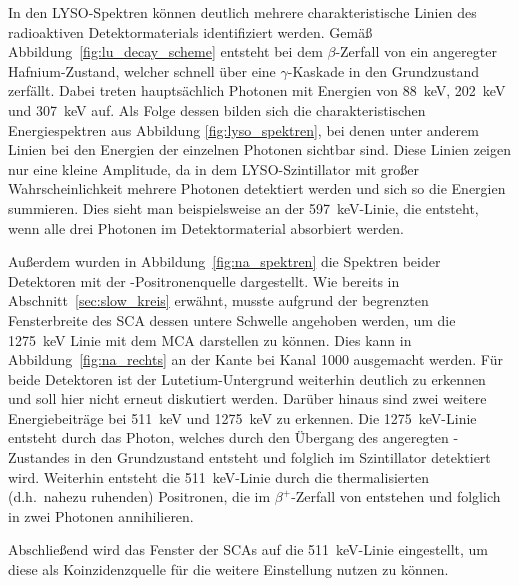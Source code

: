 \documentclass[11pt, a4paper]{article}
\numberwithin{equation}{section}
\begin{document}
In den LYSO-Spektren können deutlich mehrere charakteristische Linien des radioaktiven Detektormaterials identifiziert werden.
Gemäß Abbildung~\ref{fig:lu_decay_scheme} entsteht bei dem $\beta$-Zerfall von  ein angeregter Hafnium-Zustand, welcher schnell über eine $\gamma$-Kaskade in den Grundzustand zerfällt.
Dabei treten hauptsächlich Photonen mit Energien von \SI{88}{\keV}, \SI{202}{\keV} und \SI{307}{\keV} auf.
Als Folge dessen bilden sich die charakteristischen Energiespektren aus Abbildung \ref{fig:lyso_spektren}, bei denen unter anderem Linien bei den Energien der einzelnen Photonen sichtbar sind.
Diese Linien zeigen nur eine kleine Amplitude, da in dem LYSO-Szintillator mit großer Wahrscheinlichkeit mehrere Photonen detektiert werden und sich so die Energien summieren.
Dies sieht man beispielsweise an der \SI{597}{\keV}-Linie, die entsteht, wenn alle drei Photonen im Detektormaterial absorbiert werden.

Außerdem wurden in Abbildung~\ref{fig:na_spektren} die Spektren beider Detektoren mit der -Positronenquelle dargestellt.
Wie bereits in Abschnitt~\ref{sec:slow_kreis} erwähnt, musste aufgrund der begrenzten Fensterbreite des SCA dessen untere Schwelle angehoben werden, um die \SI{1275}{\keV} Linie mit dem MCA darstellen zu können.
Dies kann in Abbildung~\ref{fig:na_rechts} an der Kante bei Kanal 1000 ausgemacht werden.
Für beide Detektoren ist der Lutetium-Untergrund weiterhin deutlich zu erkennen und soll hier nicht erneut diskutiert werden.
Darüber hinaus sind zwei weitere Energiebeiträge bei \SI{511}{\keV} und \SI{1275}{\keV} zu erkennen.
Die \SI{1275}{\keV}-Linie entsteht durch das Photon, welches durch den Übergang des angeregten -Zustandes in den Grundzustand entsteht und folglich im Szintillator detektiert wird.
Weiterhin entsteht die \SI{511}{\keV}-Linie durch die thermalisierten (d.h.\ nahezu ruhenden) Positronen, die im $\beta^+$-Zerfall von  entstehen und folglich in zwei Photonen annihilieren.

Abschließend wird das Fenster der SCAs auf die \SI{511}{keV}-Linie eingestellt, um diese als Koinzidenzquelle für die weitere Einstellung nutzen zu können.
\end{document}
